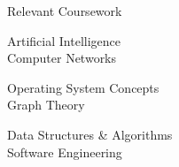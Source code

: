 \documentclass{resume} %
\begin{document}
\begin{rSection2}{Relevant Coursework}
\begin{minipage}{0.33\textwidth}
\centering
Artificial Intelligence\\
Computer Networks
\end{minipage}%
\begin{minipage}{0.33\textwidth}
\centering
Operating System Concepts\\
Graph Theory
\end{minipage}%
\begin{minipage}{0.33\textwidth}
\centering
Data Structures \& Algorithms\\
Software Engineering
\end{minipage}
\end{rSection2}
\end{document}

